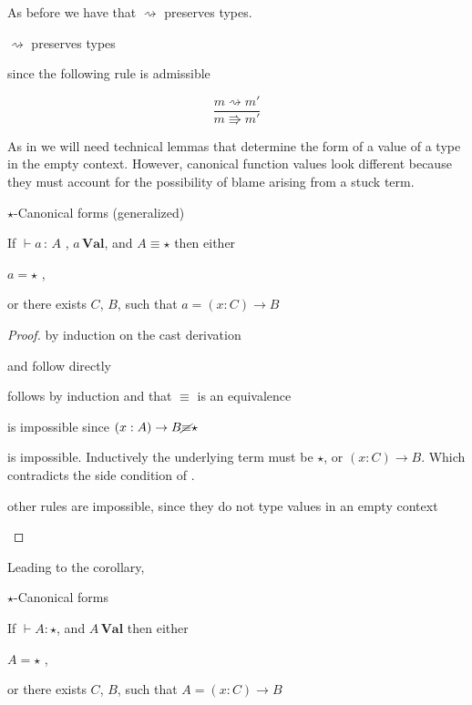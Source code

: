 As before we have that $\rightsquigarrow$ preserves types.
 
\begin{fact}
$\rightsquigarrow$ preserves types
 
since the following rule is admissible
\end{fact}
 
\[
\frac{m\rightsquigarrow m'}{m\Rrightarrow m'}
\]
 
As in  we will need technical lemmas that determine the form of a value of a type in the empty context.
However, canonical function values look different because they must account for the possibility of blame arising from a stuck term.
\begin{lem}
$\star$-Canonical forms (generalized)
 
If $\vdash a\,:\,A$ , $a\,\textbf{Val}$, and $A\equiv\star$ then
either
 
\textup{$a=\star$ ,}
 
\textup{or there exists $C$, $B$, such that $a=\left(x:C\right)\rightarrow B$}
\end{lem}
 
\begin{proof}
by induction on the cast derivation
 
\begin{casenv}
 \item {} and  follow directly
 \item {} follows by induction and that $\equiv$ is an equivalence
 \item {} is impossible since $\left(x:A\right)\rightarrow B\cancel{\equiv}\star$
 \item {} is impossible.
   Inductively the underlying term must be $\star$, or $\left(x:C\right)\rightarrow B$.
   Which contradicts the side condition of .
 \item other rules are impossible, since they do not type values in an empty context
\end{casenv}
\end{proof}
Leading to the corollary,
\begin{cor}
$\star$-Canonical forms
 
If $\vdash A:\star$, and $A\,\textbf{Val}$ then either
 
\textup{$A=\star$ , }
 
\textup{or there exists $C$, $B$, such that $A=\left(x:C\right)\rightarrow B$}
\end{cor}
 

